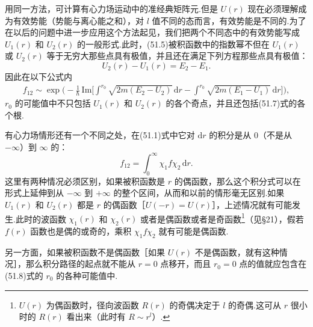 用同一方法，可计算有心力场运动中的准经典矩阵元.但是 $U(r)$ 现在必须理解成为有效势能（势能与离心能之和），对 $l$ 值不同的态而言，有效势能是不同的.为了在以后的问题中进一步应用这个方法起见，我们把两个不同态中的有效势能写成 $U_1(r)$ 和 $U_2(r)$ 的一般形式.此时，(51.5)被积函数中的指数幂不但在 $U_1(r)$ 或 $U_2(r)$ 等于无穷大那些点具有极值，并且还在满足下列方程那些点具有极值：
\begin{equation}
  U_2(r)-U_1(r)=E_2-E_1.
\end{equation}
因此在以下公式内
\begin{equation}
\begin{aligned}
  f_{12}\sim\exp\bigg(-\frac{1}{\hbar}\,\mathrm{Im}\bigg[\int^{r_0}\sqrt{2m(E_2-U_2)}\,\mathrm{d}r
  -\int^{r_0}\sqrt{2m(E_1-U_1)}\,\mathrm{d}r\bigg]\bigg),
\end{aligned}
\end{equation}
$r_0$ 的可能值中不只包括 $U_1(r)$ 和 $U_2(r)$ 的各个奇点，并且还包括(51.7)式的各个根.

有心力场情形还有一个不同之处，在(51.1)式中它对 $\mathrm{d}r$ 的积分是从 0（不是从 $-\infty$）到 $\infty$ 的：
\begin{equation*}
  f_{12}=\int_0^{\infty}\chi_1 f\chi_2\,\mathrm{d}r.
\end{equation*}
这里有两种情况必须区别，如果被积函数是 $r$ 的偶函数，那么这个积分式可以在形式上延伸到从 $-\infty$ 到 $+\infty$ 的整个区间，从而和以前的情形毫无区别.如果 $U_1(r)$ 和 $U_2(r)$ 都是 $r$ 的偶函数［$U(-r)=U(r)$］，上述情况就有可能发生.此时的波函数 $\chi_1(r)$ 和 $\chi_2(r)$ 或者是偶函数或者是奇函数\footnote{$U(r)$ 为偶函数时，径向波函数 $R(r)$ 的奇偶决定于 $l$ 的奇偶.这可从 $r$ 很小时的 $R(r)$ 看出来（此时有 $R\sim r^l$）.}（见§21），假若 $f(r)$ 函数也是偶的或奇的，乘积 $\chi_1 f\chi_2$ 就有可能是偶函数.

另一方面，如果被积函数不是偶函数［如果 $U(r)$ 不是偶函数，就有这种情况］，那么积分路径的起点就不能从 $r=0$ 点移开，而且 $r_0=0$ 点的值就应包含在(51.8)式的 $r_0$ 的各种可能值中.


